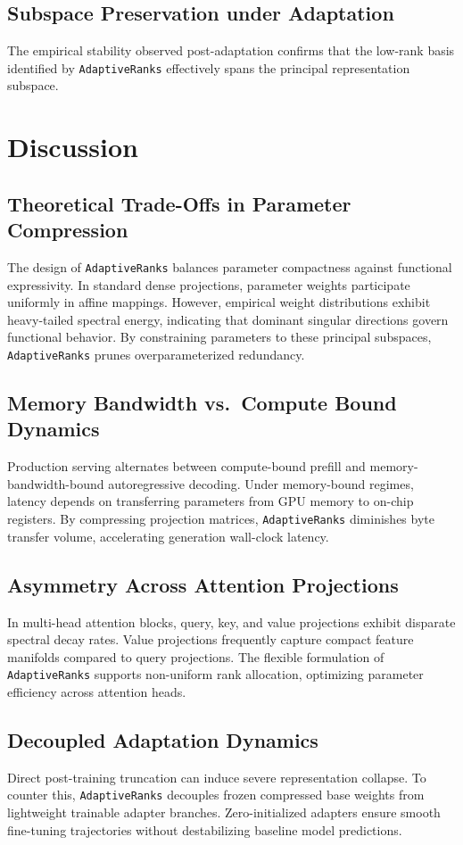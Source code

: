 \subsection{Subspace Preservation under Adaptation}
The empirical stability observed post-adaptation confirms that the low-rank basis identified by \texttt{AdaptiveRanks} effectively spans the principal representation subspace.


\section{Discussion}

\subsection{Theoretical Trade-Offs in Parameter Compression}
The design of \texttt{AdaptiveRanks} balances parameter compactness against functional expressivity. In standard dense projections, parameter weights participate uniformly in affine mappings. However, empirical weight distributions exhibit heavy-tailed spectral energy, indicating that dominant singular directions govern functional behavior. By constraining parameters to these principal subspaces, \texttt{AdaptiveRanks} prunes overparameterized redundancy.

\subsection{Memory Bandwidth vs.\ Compute Bound Dynamics}
Production serving alternates between compute-bound prefill and memory-bandwidth-bound autoregressive decoding. Under memory-bound regimes, latency depends on transferring parameters from GPU memory to on-chip registers. By compressing projection matrices, \texttt{AdaptiveRanks} diminishes byte transfer volume, accelerating generation wall-clock latency.

\subsection{Asymmetry Across Attention Projections}
In multi-head attention blocks, query, key, and value projections exhibit disparate spectral decay rates. Value projections frequently capture compact feature manifolds compared to query projections. The flexible formulation of \texttt{AdaptiveRanks} supports non-uniform rank allocation, optimizing parameter efficiency across attention heads.

\subsection{Decoupled Adaptation Dynamics}
Direct post-training truncation can induce severe representation collapse. To counter this, \texttt{AdaptiveRanks} decouples frozen compressed base weights from lightweight trainable adapter branches. Zero-initialized adapters ensure smooth fine-tuning trajectories without destabilizing baseline model predictions.

